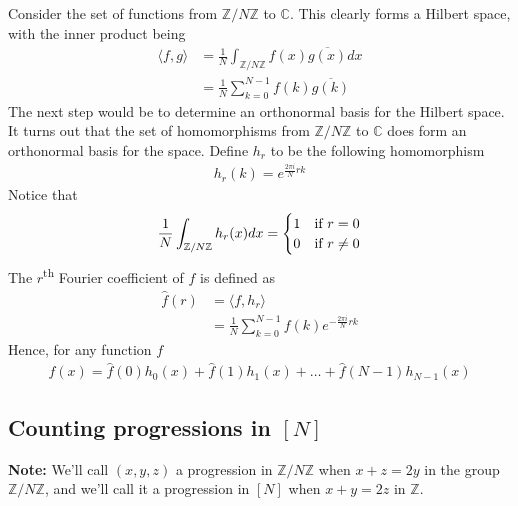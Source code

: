\documentclass[12pt, titlepage]{article}
\theoremstyle{definition}
\newcommand{\znz}{\mathbb{Z}/N\mathbb{Z}}
\newcommand{\iprod}[2]{\langle #1, #2 \rangle}
\begin{document}
Consider the set of functions from $\znz$ to $\mathbb{C}$. This clearly forms a Hilbert space, with the inner product being
\begin{align*}
   \iprod{f}{g} &= \frac{1}{N} \int_{\znz} f(x) \overline{g(x)} dx \\
   &= \frac{1}{N} \sum_{k=0}^{N-1} f(k) \overline{g(k)}
\end{align*}
The next step would be to determine an orthonormal basis for the Hilbert space. It turns out that the set of homomorphisms from $\znz$ to $\mathbb{C}$ does form an orthonormal basis for the space. Define $h_r$ to be the following homomorphism
\begin{align*}
    h_r(k) = e^{\frac{2\pi i}{N}rk}
\end{align*}
Notice that
\begin{align*}
    \frac{1}{N}\int_{\znz} h_r(x) dx =
    \begin{cases}
        1 \hfill &\text{if $r=0$} \\
        0 \hfill &\text{if $r \neq 0$}
    \end{cases}
\end{align*}
The $r$\textsuperscript{th} Fourier coefficient of $f$ is defined as
\begin{align*}
    \widehat{f}(r) &= \iprod{f}{h_r}\\ 
    &= \frac{1}{N} \sum_{k=0}^{N-1} f(k) e^{-\frac{2\pi i}{N}rk} 
\end{align*}
Hence, for any function $f$
\begin{align*}
    f(x) = \widehat{f}(0) h_0(x) + \widehat{f}(1) h_1(x) + \ldots + \widehat{f}(N-1) h_{N-1}(x)
\end{align*}

\subsection{Counting progressions in $[N]$\cite{toronto}}
\textbf{Note:} We'll call $(x,y,z)$ a progression in $\znz$ when $x+z=2y$ in the group $\znz$, and we'll call it a progression in $[N]$ when $x+y=2z$ in $\mathbb{Z}$.
\end{document}
